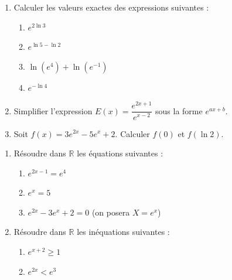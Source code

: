 \documentclass[11pt]{article}
\begin{document}
\begin{exercice}
\begin{enumerate}
    \item Calculer les valeurs exactes des expressions suivantes :
    \begin{enumerate}
        \item $e^{2\ln 3}$
        \item $e^{\ln 5 - \ln 2}$
        \item $\ln(e^{4}) + \ln(e^{-1})$
        \item $e^{-\ln 4}$
    \end{enumerate}
    \item Simplifier l'expression $E(x) = \dfrac{e^{2x+1}}{e^{x-2}}$ sous la forme $e^{ax+b}$.
    \item Soit $f(x) = 3e^{2x} - 5e^{x} + 2$. Calculer $f(0)$ et $f(\ln 2)$.
\end{enumerate}
\end{exercice}

\begin{exercice}
\begin{enumerate}
    \item Résoudre dans $\mathbb{R}$ les équations suivantes :
    \begin{enumerate}
        \item $e^{2x-1} = e^{4}$
        \item $e^{x} = 5$
        \item $e^{2x} - 3e^{x} + 2 = 0$ \quad (on posera $X = e^{x}$)
    \end{enumerate}
    \item Résoudre dans $\mathbb{R}$ les inéquations suivantes :
    \begin{enumerate}
        \item $e^{x+2} \geqslant 1$
        \item $e^{2x} < e^{3}$
    \end{enumerate}
\end{enumerate}
\end{exercice}
\end{document}
